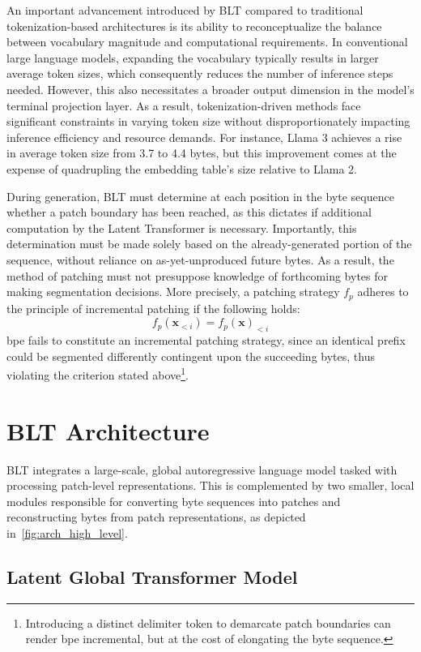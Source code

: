 An important advancement introduced by {\textsc BLT} compared to traditional tokenization-based architectures is its ability to reconceptualize the balance between vocabulary magnitude and computational requirements. In conventional large language models, expanding the vocabulary typically results in larger average token sizes, which consequently reduces the number of inference steps needed. However, this also necessitates a broader output dimension in the model’s terminal projection layer. As a result, tokenization-driven methods face significant constraints in varying token size without disproportionately impacting inference efficiency and resource demands. For instance, Llama 3 achieves a rise in average token size from 3.7 to 4.4 bytes, but this improvement comes at the expense of quadrupling the embedding table’s size relative to Llama 2.

During generation, {\textsc BLT} must determine at each position in the byte sequence whether a patch boundary has been reached, as this dictates if additional computation by the Latent Transformer is necessary. Importantly, this determination must be made solely based on the already-generated portion of the sequence, without reliance on as-yet-unproduced future bytes. As a result, the method of patching must not presuppose knowledge of forthcoming bytes for making segmentation decisions. More precisely, a patching strategy $f_p$ adheres to the principle of incremental patching if the following holds:
$$f_p(\pmb{x}_{<i}) = f_p(\pmb{x})_{<i}$$
bpe fails to constitute an incremental patching strategy, since an identical prefix could be segmented differently contingent upon the succeeding bytes, thus violating the criterion stated above\footnote{Introducing a distinct delimiter token to demarcate patch boundaries can render bpe incremental, but at the cost of elongating the byte sequence.}.

\section{{\textsc BLT} Architecture}
\label{section:architecture}
{\textsc BLT} integrates a large-scale, global autoregressive language model tasked with processing patch-level representations. This is complemented by two smaller, local modules responsible for converting byte sequences into patches and reconstructing bytes from patch representations, as depicted in~\autoref{fig:arch_high_level}.

\subsection{Latent Global Transformer Model}

